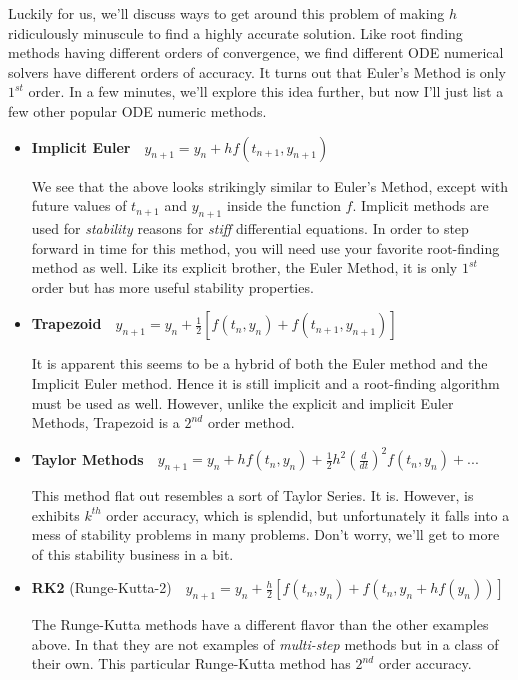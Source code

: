 \documentclass[paper=a4, fontsize=11pt]{scrartcl} %
\numberwithin{equation}{section} %
\numberwithin{figure}{section} %
\numberwithin{table}{section} %
\begin{document}
Luckily for us, we'll discuss ways to get around this problem of making $h$ ridiculously minuscule to find a highly accurate solution. Like root finding methods having different orders of convergence, we find different ODE numerical solvers have different orders of accuracy. It turns out that Euler's Method is only $1^{st}$ order. In a few minutes, we'll explore this idea further, but now I'll just list a few other popular ODE numeric methods.

\begin{itemize}
\item {\bf{Implicit Euler}}\  \ $y_{n+1} = y_{n} + h f(t_{n+1},y_{n+1})$ 

	We see that the above looks strikingly similar to Euler's Method, except with future values of $t_{n+1}$ and $y_{n+1}$ inside the function $f$. Implicit methods are used for \emph{stability} reasons for \emph{stiff} differential equations. In order to step forward in time for this method, you will need use your favorite root-finding method as well. Like its explicit brother, the Euler Method, it is only $1^{st}$ order but has more useful stability properties.

\item {\bf{Trapezoid}}\ \ $y_{n+1} = y_{n} + \frac{1}{2} \left[ f(t_n,y_n) + f(t_{n+1},y_{n+1}) \right]$ 

	It is apparent this seems to be a hybrid of both the Euler method and the Implicit Euler method. Hence it is still implicit and a root-finding algorithm must be used as well. However, unlike the explicit and implicit Euler Methods, Trapezoid is a $2^{nd}$ order method.

\item {\bf{Taylor Methods}}\ \ $y_{n+1} = y_{n} + h f(t_n,y_n) + \frac{1}{2} h^2 \left(\frac{d}{dt}\right)^2 f(t_n,y_n) + ...$

	This method flat out resembles a sort of Taylor Series. It is. However, is exhibits $k^{th}$ order accuracy, which is splendid, but unfortunately it falls into a mess of stability problems in many problems. Don't worry, we'll get to more of this stability business in a bit.

\item {\bf{RK2}} (Runge-Kutta-2)\ \ $y_{n+1} = y_n + \frac{h}{2} \left[ f(t_n,y_n) + f(t_n,y_n+hf(y_n))  \right]$

	The Runge-Kutta methods have a different flavor than the other examples above. In that they are not examples of \emph{multi-step} methods but in a class of their own. This particular Runge-Kutta method has $2^{nd}$ order accuracy.


\end{itemize}
\end{document}
